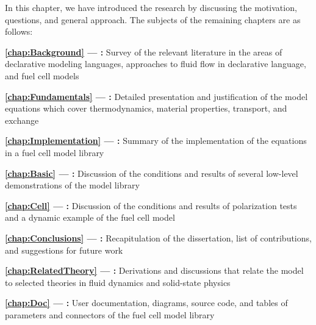 In this chapter, we have introduced the research by discussing the motivation, questions, and general approach.  The subjects of the remaining chapters are as follows:
\begin{itemize*}
  \item \textbf{\autoref{chap:Background} --- :}  Survey of the relevant literature in the areas of declarative modeling languages, approaches to fluid flow in declarative language, and fuel cell models
  \item \textbf{\autoref{chap:Fundamentals} --- :}  Detailed presentation and justification of the model equations which cover thermodynamics, material properties, transport, and exchange
  \item \textbf{\autoref{chap:Implementation} --- :}  Summary of the implementation of the equations in a fuel cell model library
  \item \textbf{\autoref{chap:Basic} --- :}  Discussion of the conditions and results of several low-level demonstrations of the model library
  \item \textbf{\autoref{chap:Cell} --- :}  Discussion of the conditions and results of polarization tests and a dynamic example of the fuel cell model
  \item \textbf{\autoref{chap:Conclusions} --- :}  Recapitulation of the dissertation, list of contributions, and suggestions for future work
  \item \textbf{\autoref{chap:RelatedTheory} --- :}  Derivations and discussions that relate the model to selected theories in fluid dynamics and solid-state physics
  \item \textbf{\autoref{chap:Doc} --- :}  User documentation, diagrams, source code, and tables of parameters and connectors of the fuel cell model library
\end{itemize*}